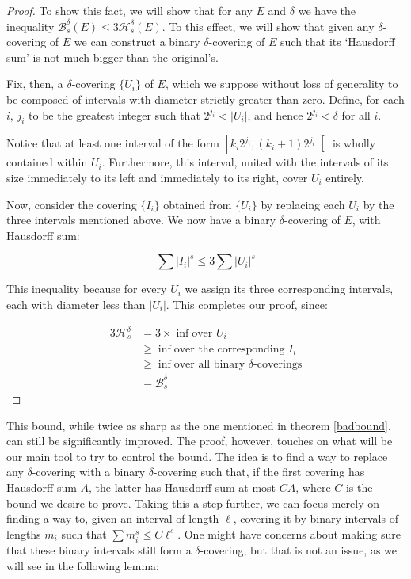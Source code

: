 \documentclass[11pt]{amsart}
\newcommand{\HH}{\mathcal{H}}
\newcommand{\BB}{\mathcal{B}}
\begin{document}
\begin{proof}
To show this fact, we will show that for any $E$ and $\delta$ we have the inequality $\BB_s^\delta(E) \leq 3 \HH_s^\delta(E)$. To this effect, we will show that given any $\delta$-covering of $E$ we can construct a binary $\delta$-covering of $E$ such that its `Hausdorff sum' is not much bigger than the original's.

Fix, then, a $\delta$-covering $\{U_i\}$ of $E$, which we suppose without loss of generality to be composed of intervals with diameter strictly greater than zero. Define, for each $i$, $j_i$ to be the greatest integer such that $2^{j_i} < \lvert U_i \rvert$, and hence $2^{j_i} < \delta$ for all $i$.

Notice that at least one interval of the form $\left[ k_i 2^{j_i}, (k_i + 1) 2^{j_i} \right[$ is wholly contained within $U_i$. Furthermore, this interval, united with the intervals of its size immediately to its left and immediately to its right, cover $U_i$ entirely.

Now, consider the covering $\{I_i\}$ obtained from $\{U_i\}$ by replacing each $U_i$ by the three intervals mentioned above. We now have a binary $\delta$-covering of $E$, with Hausdorff sum:

\[\sum \lvert I_i \rvert^s \leq 3 \sum \lvert U_i \rvert^s\]

This inequality because for every $U_i$ we assign its three corresponding intervals, each with diameter less than $\lvert U_i \rvert$. This completes our proof, since:

\begin{align*}
3 \HH_s^\delta &= 3 \times \inf \text{over $U_i$}\\
&\geq \inf \text{over the corresponding $I_i$}\\
&\geq \inf \text{over all binary $\delta$-coverings}\\
&= \BB_s^\delta
\end{align*}

\end{proof}

This bound, while twice as sharp as the one mentioned in theorem \ref{badbound}, can still be significantly improved. The proof, however, touches on what will be our main tool to try to control the bound. The idea is to find a way to replace any $\delta$-covering with a binary $\delta$-covering such that, if the first covering has Hausdorff sum $A$, the latter has Hausdorff sum at most $CA$, where $C$ is the bound we desire to prove. Taking this a step further, we can focus merely on finding a way to, given an interval of length $\ell$, covering it by binary intervals of lengths $m_i$ such that $\sum m_i^s \leq C \ell^s$. One might have concerns about making sure that these binary intervals still form a $\delta$-covering, but that is not an issue, as we will see in the following lemma:
\end{document}
